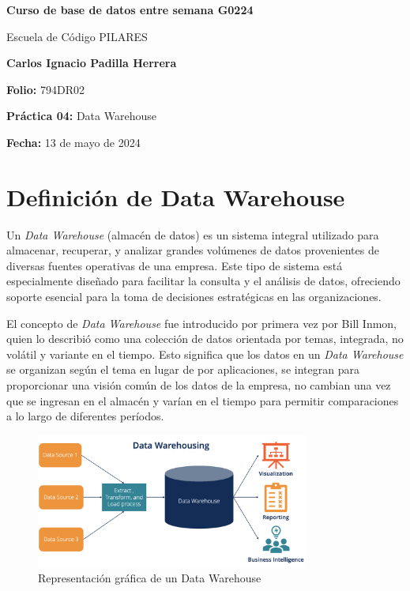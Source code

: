 \documentclass{article}
\begin{document}
\begin{titlepage}
    \centering
    \vspace*{1cm}
    \Huge\textbf{Curso de base de datos entre semana G0224}
    
    \vspace{0.5cm}
    \LARGE Escuela de Código PILARES
    
    \vspace{1.5cm}
    \textbf{Carlos Ignacio Padilla Herrera}
    
    \vspace{2cm}
    \Large\textbf{Folio:} 794DR02
    
    \vspace{0.5cm}
    \Large\textbf{Práctica 04:} Data Warehouse
    
    \vfill
    
    \Large\textbf{Fecha:} 13 de mayo de 2024
    
    \vspace{0.8cm}
\end{titlepage}

\section{Definición de Data Warehouse}
Un \textit{Data Warehouse} (almacén de datos) es un sistema integral utilizado para almacenar, recuperar, y analizar grandes volúmenes de datos provenientes de diversas fuentes operativas de una empresa. Este tipo de sistema está especialmente diseñado para facilitar la consulta y el análisis de datos, ofreciendo soporte esencial para la toma de decisiones estratégicas en las organizaciones.

El concepto de \textit{Data Warehouse} fue introducido por primera vez por Bill Inmon, quien lo describió como una colección de datos orientada por temas, integrada, no volátil y variante en el tiempo. Esto significa que los datos en un \textit{Data Warehouse} se organizan según el tema en lugar de por aplicaciones, se integran para proporcionar una visión común de los datos de la empresa, no cambian una vez que se ingresan en el almacén y varían en el tiempo para permitir comparaciones a lo largo de diferentes períodos.

\begin{figure}[ht]
    \centering
    \includegraphics[width=0.8\textwidth]{data-warehouse.png}
    \caption{Representación gráfica de un Data Warehouse}
\end{figure}
\end{document}
